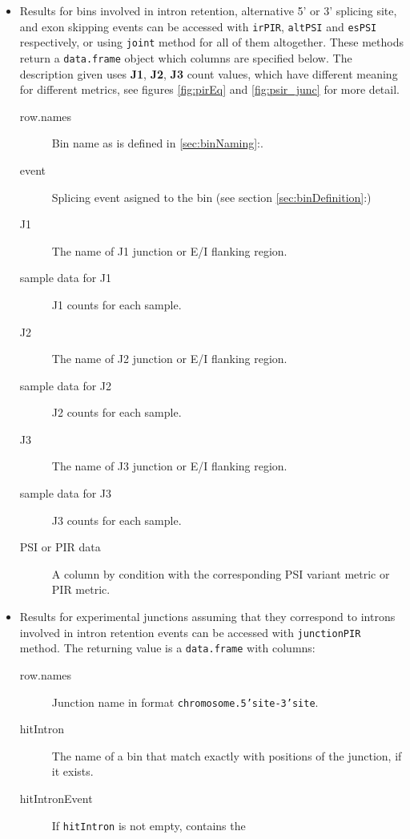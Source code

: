 \documentclass{article}
\newcommand{\secref}[1]{\ref{#1}:\nameref{#1}}
\begin{document}
\begin{itemize}
  \item Results for bins involved in intron retention, alternative 5' or 3'
  splicing site, and exon skipping events can be accessed with \texttt{irPIR},
  \texttt{altPSI} and \texttt{esPSI} respectively, or using \texttt{joint}
  method for all of them altogether. These methods return a \texttt{data.frame}
  object which columns are specified below. The description given uses
  \textbf{J1}, \textbf{J2}, \textbf{J3} count values, which have different
  meaning for different metrics, see figures \ref{fig:pirEq} and
  \ref{fig:psir_junc} for more detail.
    \begin{description}
      \item[row.names] Bin name as is defined in \secref{sec:binNaming}.
      \item[event] Splicing event asigned to the bin (see section
      \ref{sec:binDefinition}:)
      \item[J1] The name of J1 junction or E/I flanking region.
      \item[sample data for J1] J1 counts for each sample.
      \item[J2] The name of J2 junction or E/I flanking region.
      \item[sample data for J2] J2 counts for each sample.
      \item[J3] The name of J3 junction or E/I flanking region.
      \item[sample data for J3] J3 counts for each sample.
      \item[PSI or PIR data] A column by condition with the corresponding PSI
      variant metric or PIR metric.
      \\
    \end{description}
  \item Results for experimental junctions assuming that they correspond to
  introns involved in intron retention events can be accessed with
  \texttt{junctionPIR} method. The returning value is a \texttt{data.frame} with
  columns:
    \begin{description}
      \item[row.names] Junction name in format \texttt{chromosome.5'site-3'site}.
      \item[hitIntron] The name of a bin that match exactly with positions of
      the junction, if it exists.
      \item[hitIntronEvent] If \texttt{hitIntron} is not empty, contains the

\end{description}
\end{itemize}
\end{document}
